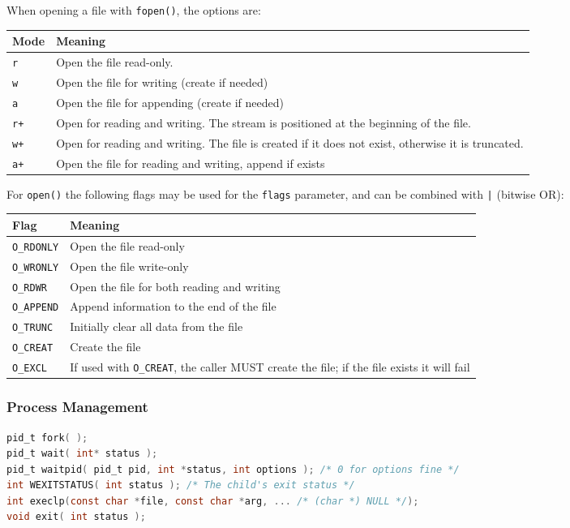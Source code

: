 \documentclass[legalpaper,10pt]{article}
\begin{document}
When opening a file with \texttt{fopen()}, the options are:\\
\begin{tabular}{l|l}
	\textbf{Mode} & \textbf{Meaning} \\ \hline
	\texttt{r} & Open the file read-only. \\ \hline
	\texttt{w} & Open the file for writing (create if needed) \\ \hline
	\texttt{a} & Open the file for appending (create if needed) \\ \hline
	\texttt{r+} & Open for reading and writing. The stream is positioned at the beginning of the file. \\ \hline
	\texttt{w+} & Open for reading and writing. The file is created if it does not exist, otherwise it is truncated. \\ \hline
	\texttt{a+} & Open the file for reading and writing, append if exists \\
\end{tabular}


For \texttt{open()} the following flags may be used for the \texttt{flags} parameter, and can be combined with \texttt{|} (bitwise OR):\\
\begin{tabular}{l|l}
	\textbf{Flag} & \textbf{Meaning} \\ \hline
	\texttt{O\_RDONLY} & Open the file read-only \\ \hline
	\texttt{O\_WRONLY} & Open the file write-only \\ \hline
	\texttt{O\_RDWR} & Open the file for both reading and writing \\ \hline
	\texttt{O\_APPEND} & Append information to the end of the file \\ \hline
	\texttt{O\_TRUNC} & Initially clear all data from the file \\ \hline
	\texttt{O\_CREAT} & Create the file \\ \hline	
	\texttt{O\_EXCL} & If used with \texttt{O\_CREAT}, the caller MUST create the file; if the file exists it will fail \\ 	
\end{tabular}


\subsubsection*{Process Management}

\begin{lstlisting}[language=C]
pid_t fork( );
pid_t wait( int* status );
pid_t waitpid( pid_t pid, int *status, int options ); /* 0 for options fine */
int WEXITSTATUS( int status ); /* The child's exit status */
int execlp(const char *file, const char *arg, ... /* (char *) NULL */);
void exit( int status );
\end{lstlisting}
\newpage
\end{document}
